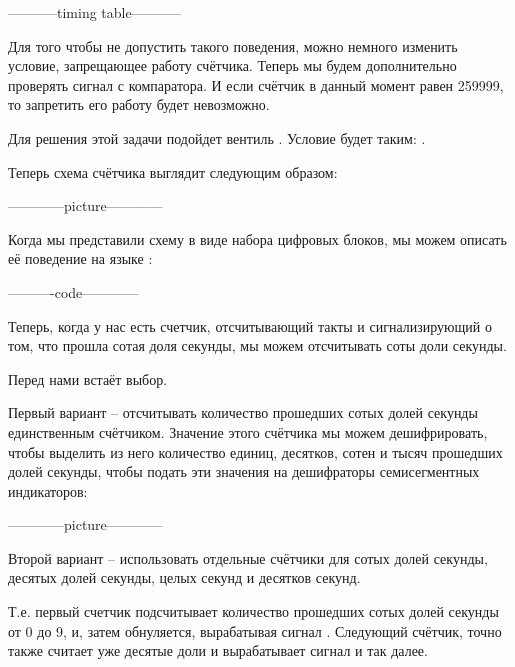 \par{-----------timing table-----------}

\par{Для того чтобы не допустить такого поведения, можно немного изменить условие, запрещающее работу счётчика. Теперь мы будем дополнительно проверять сигнал с компаратора. И если счётчик в данный момент равен 259999, то запретить его работу будет невозможно.}

\par{Для решения этой задачи подойдет вентиль . Условие будет таким: .}

\par{Теперь схема счётчика выглядит следующим образом:}

\par{------------picture------------}

\par{Когда мы представили схему в виде набора цифровых блоков, мы можем описать её поведение на языке :}

\par{----------code------------}

\par{Теперь, когда у нас есть счетчик, отсчитывающий такты и сигнализирующий о том, что прошла сотая доля секунды, мы можем отсчитывать соты доли секунды.}

\par{Перед нами встаёт выбор.}

\par{Первый вариант – отсчитывать количество прошедших сотых долей секунды единственным счётчиком. Значение этого счётчика мы можем дешифрировать, чтобы выделить из него количество единиц, десятков, сотен и тысяч прошедших долей секунды, чтобы подать эти значения на дешифраторы семисегментных индикаторов:}

\par{------------picture------------}

\par{Второй вариант – использовать отдельные счётчики для сотых долей секунды, десятых долей секунды, целых секунд и десятков секунд.}

\par{Т.е. первый счетчик подсчитывает количество прошедших сотых долей секунды от 0 до 9, и, затем обнуляется, вырабатывая сигнал . Следующий счётчик, точно также считает уже десятые доли и вырабатывает сигнал  и так далее.}

